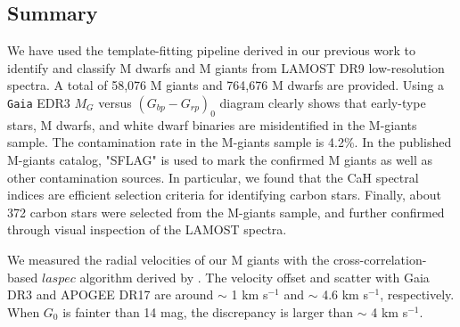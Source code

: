 \documentclass[manuscript]{aastex62}
\newcommand{\gaia}{\texttt{Gaia}}
\begin{document}
\begin{CJK*}{UTF8}{gbsn}



\section{Summary}
 We have used the template-fitting pipeline derived in our previous work to identify and classify M dwarfs and M giants from LAMOST DR9 low-resolution spectra. A total of 58,076 M giants and 764,676 M dwarfs are provided. Using a \gaia{} EDR3 $M_G$ versus $(G_{bp}-G_{rp})_0$ diagram clearly shows that early-type stars, M dwarfs, and white dwarf binaries are misidentified in the M-giants sample. The contamination rate in the M-giants sample is 4.2\%.  In the published M-giants catalog, "SFLAG" is used to mark the confirmed M giants as well as other contamination sources. In particular, we found that the CaH spectral indices are efficient selection criteria for identifying carbon stars. Finally, about 372 carbon stars were selected from the M-giants sample, and further confirmed through visual inspection of the LAMOST spectra. 

We measured the radial velocities of our M giants with the cross-correlation-based $laspec$ algorithm derived by \citet{2021ApJS..256...14Z}. The velocity offset and scatter with Gaia DR3 and APOGEE DR17 are around $\sim$ 1 km s$^{-1}$ and $\sim$ 4.6 km s$^{-1}$, respectively. When $G_{0}$ is fainter than 14 mag, the discrepancy is larger than $\sim$ 4 km s$^{-1}$. 
 

\end{CJK*}
\end{document}
